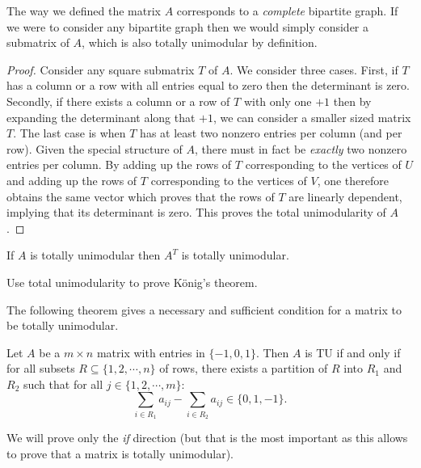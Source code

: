 \documentclass[12pt]{article}
\begin{document}
The way we defined the matrix $A$ corresponds to a {\it complete}
bipartite graph. If we were to consider any bipartite graph then we
would simply consider a submatrix of $A$, which is also totally
unimodular by definition.  

\begin{proof}
Consider any square submatrix $T$ of $A$. We consider three cases.
First, if $T$ has a column or a row with all
entries equal to zero then the determinant is zero. Secondly, if there exists a
column or a row of $T$ with only one $+1$ then by expanding the
determinant along that $+1$, we can consider a smaller sized matrix
$T$. The last case is when $T$ has at least two nonzero entries per
column (and per row). Given the special structure of $A$, there must
in fact be {\it exactly} two nonzero entries per column. By adding up
the rows of $T$ corresponding to the vertices of $U$ and adding up the
rows of $T$ corresponding to the vertices of $V$, one therefore
obtains the same vector which proves that the rows of $T$ are linearly
dependent, implying that its determinant is zero. This proves the
total unimodularity of $A$.
\end{proof}


\begin{exercises}
\item
If $A$ is totally unimodular then
$A^T$ is totally unimodular. 
\item
Use total unimodularity to prove
K\"onig's theorem.
\end{exercises}

The following theorem gives a necessary and sufficient condition for a
matrix to be totally unimodular. 

\begin{theorem}
Let $A$ be a $m\times n$ matrix with entries in $\{-1,0,1\}$. Then $A$
is TU if and only if for all subsets $R\subseteq \{1,2,\cdots,n\}$ of
rows, there exists a partition of $R$ into $R_1$ and $R_2$ such that
for all $j\in\{1,2,\cdots,m\}$: 
$$\sum_{i\in R_1} a_{ij} - \sum_{i\in R_2} a_{ij} \in\{0,1,-1\}.$$
\end{theorem}

We will prove only the {\it if} direction (but that is the most important as this allows to prove that a matrix is totally unimodular). 
\end{document}
